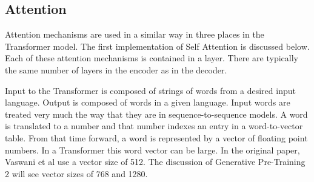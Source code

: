 \subsection{Attention}
Attention mechanisms are used in a similar way in three places in the Transformer model. The first implementation of Self Attention is discussed below. Each of these attention mechanisms is contained in a layer. There are typically the same number of layers in the encoder as in the decoder.

Input to the Transformer is composed of strings of words from a desired input language. Output is composed of words in a given language. Input words are treated very much the way that they are in sequence-to-sequence models. A word is translated to a number and that number indexes an entry in a word-to-vector table. From that time forward, a word is represented by a vector of floating point numbers. In a Transformer this word vector can be large. In the original paper, Vaswani et al \cite{Vaswani2017AttentionIA} use a vector size of 512. The discussion of Generative Pre-Training 2 will see vector sizes of 768 and 1280.

